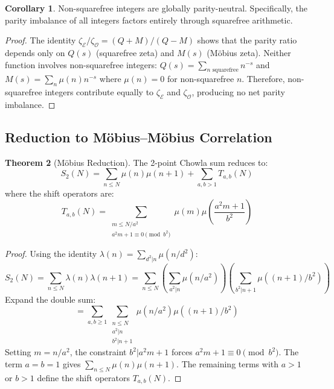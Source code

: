 \documentclass[11pt,a4paper]{article}
\theoremstyle{definition}
\newtheorem{theorem}{Theorem}[section]
\newtheorem{corollary}[theorem]{Corollary}
\newcommand{\EE}{\mathcal{E}}
\newcommand{\OO}{\mathcal{O}}
\begin{document}
\begin{corollary}
\label{cor:parity-neutral}
Non-squarefree integers are globally parity-neutral. Specifically, the parity imbalance of all integers factors entirely through squarefree arithmetic.
\end{corollary}

\begin{proof}
The identity $\zeta_{\EE}/\zeta_{\OO} = (Q+M)/(Q-M)$ shows that the parity ratio depends only on $Q(s)$ (squarefree zeta) and $M(s)$ (M\"obius zeta). Neither function involves non-squarefree integers: $Q(s) = \sum_{n \text{ squarefree}} n^{-s}$ and $M(s) = \sum_n \mu(n) n^{-s}$ where $\mu(n) = 0$ for non-squarefree $n$. Therefore, non-squarefree integers contribute equally to $\zeta_{\EE}$ and $\zeta_{\OO}$, producing no net parity imbalance.
\end{proof}

\subsection{Reduction to M\"obius--M\"obius Correlation}

\begin{theorem}[M\"obius Reduction]
\label{thm:mobius-reduction}
The 2-point Chowla sum reduces to:
\begin{equation}
S_2(N) = \sum_{n \le N} \mu(n)\mu(n+1) + \sum_{a,b > 1} T_{a,b}(N)
\end{equation}
where the shift operators are:
\begin{equation}
T_{a,b}(N) = \sum_{\substack{m \le N/a^2 \\ a^2 m + 1 \equiv 0 \pmod{b^2}}} \mu(m) \mu\!\left(\frac{a^2 m + 1}{b^2}\right)
\end{equation}
\end{theorem}

\begin{proof}
Using the identity $\lambda(n) = \sum_{d^2 | n} \mu(n/d^2)$:
\begin{equation}
S_2(N) = \sum_{n \le N} \lambda(n)\lambda(n+1) = \sum_{n \le N} \left(\sum_{a^2 | n} \mu(n/a^2)\right) \left(\sum_{b^2 | n+1} \mu((n+1)/b^2)\right)
\end{equation}
Expand the double sum:
\begin{equation}
= \sum_{a,b \ge 1} \sum_{\substack{n \le N \\ a^2 | n \\ b^2 | n+1}} \mu(n/a^2) \mu((n+1)/b^2)
\end{equation}
Setting $m = n/a^2$, the constraint $b^2 | a^2 m + 1$ forces $a^2 m + 1 \equiv 0 \pmod{b^2}$. The term $a = b = 1$ gives $\sum_{n \le N} \mu(n)\mu(n+1)$. The remaining terms with $a > 1$ or $b > 1$ define the shift operators $T_{a,b}(N)$.
\end{proof}
\end{document}
